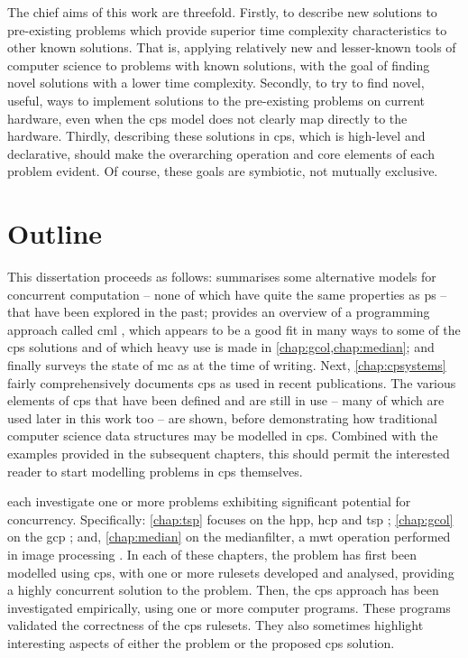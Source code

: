 The chief aims of this work are threefold.  Firstly, to describe new solutions to pre-existing problems which provide superior time complexity characteristics to other known solutions.  That is, applying relatively new and lesser-known tools of computer science to problems with known solutions, with the goal of finding novel solutions with a lower time complexity.  Secondly, to try to find novel, useful, ways to implement solutions to the pre-existing problems on current hardware, even when the \gls{cps} model does not clearly map directly to the hardware.  Thirdly, describing these solutions in \gls{cps}, which is high-level and declarative, should make the overarching operation and core elements of each problem evident.  Of course, these goals are symbiotic, not mutually exclusive.

\section{Outline}

This dissertation proceeds as follows:  summarises some alternative models for concurrent computation -- none of which have quite the same properties as \gls{ps} -- that have been explored in the past; provides an overview of a programming approach called \gls{cml} \cite{Reppy2007,Reppy1991}, which appears to be a good fit in many ways to some of the \gls{cps} solutions and of which heavy use is made in \cref{chap:gcol,chap:median}; and finally surveys the state of \gls{mc} as at the time of writing.  Next, \cref{chap:cpsystems} fairly comprehensively documents \gls{cps} as used in recent publications.  The various elements of \gls{cps} that have been defined and are still in use -- many of which are used later in this work too -- are shown, before demonstrating how traditional computer science data structures may be modelled in \gls{cps}.  Combined with the examples provided in the subsequent chapters, this should permit the interested reader to start modelling problems in \gls{cps} themselves.

 each investigate one or more problems exhibiting significant potential for concurrency.  Specifically: \cref{chap:tsp} focuses on the \gls{hpp}, \gls{hcp} and \gls{tsp} \cite{Applegate2006,Cook2012}; \cref{chap:gcol} on the \gls{gcp} \cite{Lewis2016}; and, \cref{chap:median} on the \gls{medianfilter}, a \gls{mwt} operation performed in image processing \cite{Fisher2016,Gimelfarb2018}.  In each of these chapters, the problem has first been modelled using \gls{cps}, with one or more \glspl{ruleset} developed and analysed, providing a highly concurrent solution to the problem.  Then, the \gls{cps} approach has been investigated empirically, using one or more computer programs.  These programs validated the correctness of the \gls{cps} \glspl{ruleset}.  They also sometimes highlight interesting aspects of either the problem or the proposed \gls{cps} solution.


